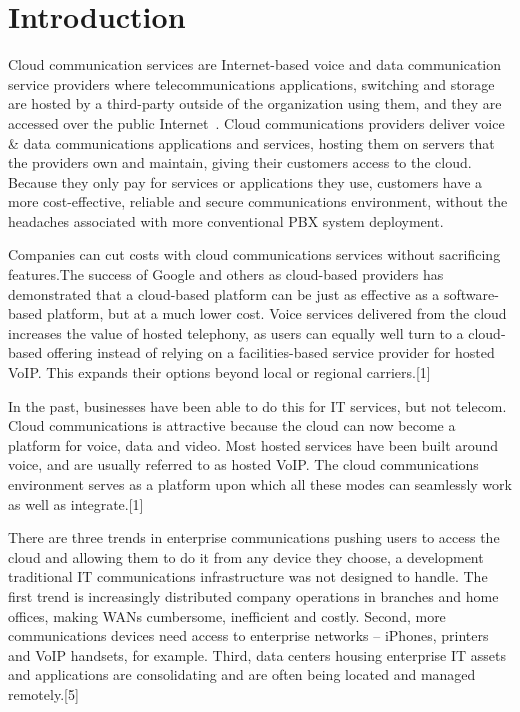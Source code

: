 
\section{Introduction}
\label{sec-intro}

Cloud communication services are Internet-based voice and data communication service providers where telecommunications applications, switching and storage are hosted by a third-party outside of the organization using them, and they are accessed over the public Internet~\cite{wikicc}. 
Cloud communications providers deliver voice & data communications applications and services, hosting them on servers that the providers own and maintain, giving their customers access to the cloud. Because they only pay for services or applications they use, customers have a more cost-effective, reliable and secure communications environment, without the headaches associated with more conventional PBX system deployment.

Companies can cut costs with cloud communications services without sacrificing features.The success of Google and others as cloud-based providers has demonstrated that a cloud-based platform can be just as effective as a software-based platform, but at a much lower cost. Voice services delivered from the cloud increases the value of hosted telephony, as users can equally well turn to a cloud-based offering instead of relying on a facilities-based service provider for hosted VoIP. This expands their options beyond local or regional carriers.[1]

In the past, businesses have been able to do this for IT services, but not telecom. Cloud communications is attractive because the cloud can now become a platform for voice, data and video. Most hosted services have been built around voice, and are usually referred to as hosted VoIP. The cloud communications environment serves as a platform upon which all these modes can seamlessly work as well as integrate.[1]

There are three trends in enterprise communications pushing users to access the cloud and allowing them to do it from any device they choose, a development traditional IT communications infrastructure was not designed to handle. The first trend is increasingly distributed company operations in branches and home offices, making WANs cumbersome, inefficient and costly. Second, more communications devices need access to enterprise networks – iPhones, printers and VoIP handsets, for example. Third, data centers housing enterprise IT assets and applications are consolidating and are often being located and managed remotely.[5]